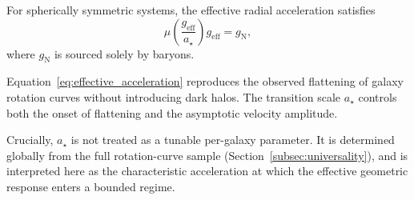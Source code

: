   For spherically symmetric systems,
  the effective radial acceleration satisfies
  \begin{equation}
    \mu\!\left( \frac{g_{\mathrm{eff}}}{a_\star} \right)
    g_{\mathrm{eff}}
    =
    g_{\mathrm{N}} ,
    \label{eq:effective_acceleration}
  \end{equation}
  where $g_{\mathrm{N}}$ is sourced solely by baryons.

  Equation~\eqref{eq:effective_acceleration} reproduces the observed
  flattening of galaxy rotation curves without introducing dark halos.
  The transition scale $a_\star$ controls both the onset of flattening
  and the asymptotic velocity amplitude.

  Crucially, $a_\star$ is not treated as a tunable per-galaxy parameter.
  It is determined globally from the full rotation-curve sample
  (Section~\ref{subsec:universality}),
  and is interpreted here as the characteristic acceleration at which
  the effective geometric response enters a bounded regime.
